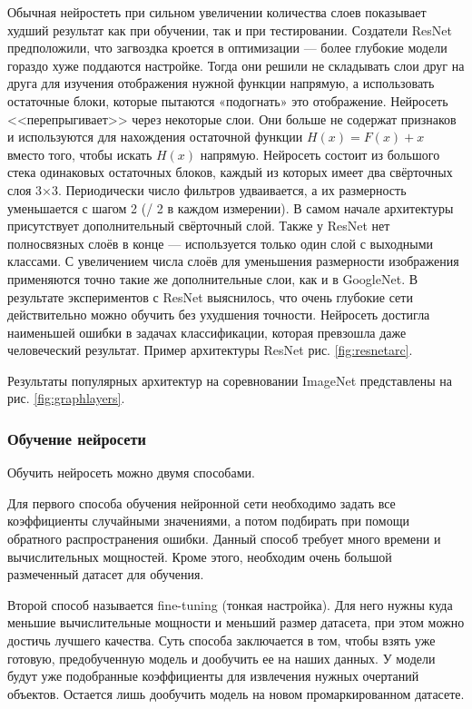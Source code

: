 \documentclass[a4paper,14pt]{article}
\begin{document}
Обычная нейростеть при сильном увеличении количества слоев показывает худший результат как при обучении, так и при тестировании.
Создатели ResNet предположили, что загвоздка кроется в оптимизации — более глубокие модели гораздо хуже поддаются настройке.
Тогда они решили не складывать слои друг на друга для изучения отображения нужной функции напрямую, а использовать остаточные блоки, которые пытаются «подогнать» это отображение.
Нейросеть <<перепрыгивает>> через некоторые слои.
Они больше не содержат признаков и используются для нахождения остаточной функции $H(x) = F(x) + x$ вместо того, чтобы искать $H(x)$ напрямую.
Нейросеть состоит из большого стека одинаковых остаточных блоков, каждый из которых имеет два свёрточных слоя 3×3.
Периодически число фильтров удваивается, а их размерность уменьшается с шагом 2 (/ 2 в каждом измерении).
В самом начале архитектуры присутствует дополнительный свёрточный слой.
Также у ResNet нет полносвязных слоёв в конце — используется только один слой с выходными классами.
С увеличением числа слоёв для уменьшения размерности изображения применяются точно такие же дополнительные слои, как и в GoogleNet. 
В результате экспериментов с ResNet выяснилось, что очень глубокие сети действительно можно обучить без ухудшения точности.
Нейросеть достигла наименьшей ошибки в задачах классификации, которая превзошла даже человеческий результат.
Пример архитектуры ResNet рис. \ref{fig:resnetarc}.

Результаты популярных архитектур на соревновании ImageNet представлены на рис. \ref{fig:graphlayers}.


\subsubsection{Обучение нейросети}

Обучить нейросеть можно двумя способами.

Для первого способа обучения нейронной сети необходимо задать все коэффициенты случайными значениями, а потом подбирать при помощи обратного распространения ошибки.
Данный способ требует много времени и вычислительных мощностей.
Кроме этого, необходим очень большой размеченный датасет для обучения.

Второй способ называется fine-tuning (тонкая настройка).
Для него нужны куда меньшие вычислительные мощности и меньший размер датасета, при этом можно достичь лучшего качества.
Суть способа заключается в том, чтобы взять уже готовую, предобученную модель и дообучить ее на наших данных.
У модели будут уже подобранные коэффициенты для извлечения нужных очертаний объектов.
Остается лишь дообучить модель на новом промаркированном датасете.
\end{document}
